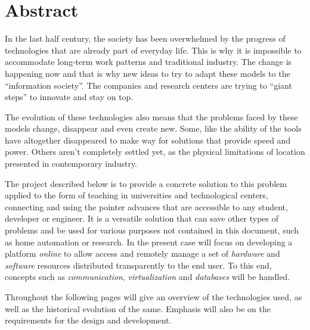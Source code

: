 \section*{Abstract}

In the last half century, the society has been overwhelmed by the 
progress of technologies that are already part of everyday life. This 
is why it is impossible to accommodate long-term work patterns and 
traditional industry. The change is happening now and that is why new 
ideas to try to adapt these models to the ``information society''. The 
companies and research centers are trying to ``giant steps'' to innovate 
and stay on top.

The evolution of these technologies also means that the problems faced 
by these models change, disappear and even create new. Some, like the 
ability of the tools have altogether disappeared to make way for 
solutions that provide speed and power. Others aren’t completely 
settled yet, as the physical limitations of location presented in 
contemporary industry.

The project described below is to provide a concrete solution to this problem
applied to the form of teaching in universities and technological centers,
connecting and using the pointer advances that are accessible to any student,
developer or engineer. It is a versatile solution that can save other 
types of problems and be used for various purposes not contained in 
this document, such as home automation or research. In the present case 
will focus on developing a platform \emph{online} to allow access and 
remotely manage a set of \emph{hardware} and \emph{software} resources distributed 
transparently to the end user. To this end, concepts such as 
\emph{communication}, \emph{virtualization} and \emph{databases} will 
be handled.

Throughout the following pages will give an overview of the 
technologies used, as well as the historical evolution of the same. 
Emphasis will also be on the requirements for the design and development.

\cleardoublepage
